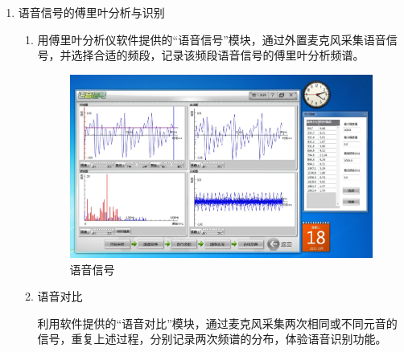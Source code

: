 \documentclass[11pt]{article}
\begin{document}
\begin{enumerate}
    \item 语音信号的傅里叶分析与识别
    \begin{enumerate}
        \item 用傅里叶分析仪软件提供的“语音信号”模块，通过外置麦克风采集语音信号，并选择合适的频段，记录该频段语音信号的傅里叶分析频谱。
        \begin{figure}[H]
            \centering
            \includegraphics[width=15cm]{Fig/图11 语音信号.JPG}
            \caption{语音信号}
        \end{figure}
        \item 语音对比
        
        利用软件提供的“语音对比”模块，通过麦克风采集两次相同或不同元音的信号，重复上述过程，分别记录两次频谱的分布，体验语音识别功能。


\end{enumerate}
\end{enumerate}
\end{document}
